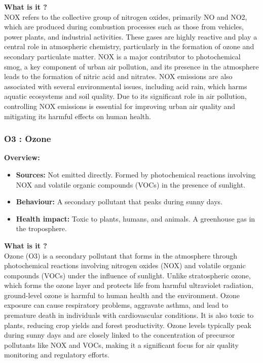 \documentclass{modeleRapport}
\begin{document}
\textbf{What is it ?}\\

NOX refers to the collective group of nitrogen oxides, primarily NO and NO2, which are produced during combustion processes 
such as those from vehicles, power plants, and industrial activities. These gases are highly reactive and play a central role 
in atmospheric chemistry, particularly in the formation of ozone and secondary particulate matter. NOX is a major contributor 
to photochemical smog, a key component of urban air pollution, and its presence in the atmosphere leads to the formation of 
nitric acid and nitrates. NOX emissions are also associated with several environmental issues, including acid rain, which 
harms aquatic ecosystems and soil quality. Due to its significant role in air pollution, controlling NOX emissions is 
essential for improving urban air quality and mitigating its harmful effects on human health.\\


\subsubsection{O3 : Ozone}

\textbf{Overview:}\\

\begin{itemize}
    \item \textbf{Sources:} Not emitted directly. Formed by photochemical reactions involving NOX and volatile organic compounds 
    (VOCs) in the presence of sunlight.
    \item \textbf{Behaviour:} A secondary pollutant that peaks during sunny days.
    \item \textbf{Health impact:} Toxic to plants, humans, and animals. A greenhouse gas in the troposphere.\\
\end{itemize}

\textbf{What is it ?}\\

Ozone (O3) is a secondary pollutant that forms in the atmosphere through photochemical reactions involving nitrogen 
oxides (NOX) and volatile organic compounds (VOCs) under the influence of sunlight. Unlike stratospheric ozone, which 
forms the ozone layer and protects life from harmful ultraviolet radiation, ground-level ozone is harmful to human health 
and the environment. Ozone exposure can cause respiratory problems, aggravate asthma, and lead to premature death in 
individuals with cardiovascular conditions. It is also toxic to plants, reducing crop yields and forest productivity. 
Ozone levels typically peak during sunny days and are closely linked to the concentration of precursor pollutants like 
NOX and VOCs, making it a significant focus for air quality monitoring and regulatory efforts.\\
\end{document}
